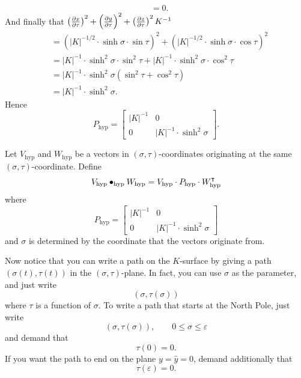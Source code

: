 \documentclass{ximera}
\begin{document}
\begin{problem}
\begin{freeResponse}
\begin{align*}
      &= 0.
    \end{align*}
    And finally that $\left(\pp[x]{\tau}\right)^2 + \left(\pp[y]{\tau}\right)^2 + \left(\pp[z]{\tau}\right)^2K^{-1}$
     \begin{align*}
       &= \left(|K|^{-1/2}\cdot \sinh\sigma\cdot \sin \tau \right)^2 + \left( |K|^{-1/2}\cdot \sinh\sigma\cdot \cos\tau \right)^2 \\
       &= |K|^{-1}\cdot \sinh^2\sigma\cdot \sin^2 \tau + |K|^{-1}\cdot \sinh^2\sigma\cdot \cos^2\tau \\
       &= |K|^{-1}\cdot \sinh^2\sigma\left(\sin^2 \tau + \cos^2\tau\right) \\
       &= |K|^{-1}\cdot \sinh^2\sigma.
     \end{align*}
     Hence
     \[
     P_\mathrm{hyp} =
  \begin{bmatrix}
    |K|^{-1} & 0 \\
    0 & |K|^{-1}\cdot\sinh^2 \sigma
  \end{bmatrix}.
     \]
  \end{freeResponse}
\end{problem}



\begin{definition}
  Let $V_\mathrm{hyp}$ and $W_\mathrm{hyp}$ be a vectors in
  $(\sigma,\tau)$-coordinates originating at the same
  $(\sigma,\tau)$-coordinate. Define
  \[
  V_\mathrm{hyp} \bullet_\mathrm{hyp} W_\mathrm{hyp} = V_\mathrm{hyp} \cdot P_\mathrm{hyp} \cdot W_\mathrm{hyp}^\transpose
  \]
  where
  \[
     P_\mathrm{hyp} =
  \begin{bmatrix}
    |K|^{-1} & 0 \\
    0 & |K|^{-1}\cdot\sinh^2 \sigma
  \end{bmatrix}
  \]
  and $\sigma$ is determined by the coordinate that the vectors
  originate from.
\end{definition}



Now notice that you can write a path on the $K$-surface by giving a
path $\left( \sigma(t),\tau(t)\right)$ in the
$(\sigma,\tau)$-plane. In fact, you can use $\sigma$ as the parameter,
and just write
\[
\left(\sigma,\tau(\sigma)\right)
\]
where $\tau$ is a function of $\sigma$. To write a path that starts at
the North Pole, just write
\[
\left(\sigma,\tau(\sigma)\right), \qquad 0\leq\sigma\leq\varepsilon
\]
and demand that
\[
\tau(0) =0.
\]
If you want the path to end on the plane $y=\hat{y}=0$, demand
additionally that
\[
\tau(\varepsilon) =0.
\]
\end{document}

